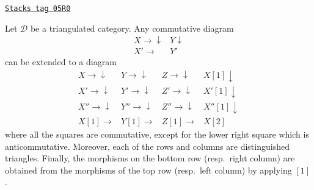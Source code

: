 \begin{proposition}[9]
\label{derived-proposition-9}
\href{https://stacks.math.columbia.edu/tag/05R0}{\texttt{Stacks tag 05R0}}

Let $\mathcal{D}$ be a triangulated category. Any commutative diagram
$$
\begin{array}{cc}X \longrightarrow\downarrow & Y \downarrow \\ X' \longrightarrow & Y'\end{array}
$$
can be extended to a diagram
$$
\begin{array}{cccc}X \longrightarrow\downarrow & Y \longrightarrow\downarrow & Z \longrightarrow\downarrow & X[1] \downarrow \\ X' \longrightarrow\downarrow & Y' \longrightarrow\downarrow & Z' \longrightarrow\downarrow & X'[1] \downarrow \\ X'' \longrightarrow\downarrow & Y'' \longrightarrow\downarrow & Z'' \longrightarrow\downarrow & X''[1] \downarrow \\ X[1] \longrightarrow & Y[1] \longrightarrow & Z[1] \longrightarrow & X[2]\end{array}
$$
where all the squares are commutative, except for the lower right square
which is anticommutative. Moreover, each of the rows and columns are
distinguished triangles. Finally, the morphisms on the bottom row
(resp.\ right column) are obtained from the morphisms of the top row
(resp.\ left column) by applying $[1]$.
\end{proposition}

